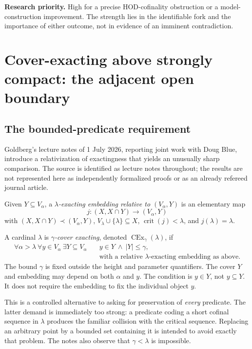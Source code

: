 \documentclass[11pt,letterpaper]{article}
\theoremstyle{definition}
\newcommand{\CEx}{\operatorname{CEx}}
\newcommand{\crit}{\operatorname{crit}}
\newcommand{\Priority}[1]{\textbf{Research priority.} #1}
\begin{document}
\Priority{High for a precise HOD-cofinality obstruction or a model-construction improvement. The strength lies in the identifiable fork and the importance of either outcome, not in evidence of an imminent contradiction.}

\section{Cover-exacting above strongly compact: the adjacent open boundary}\label{sec:cover}

\subsection{The bounded-predicate requirement}

Goldberg's lecture notes of 1 July 2026, reporting joint work with Doug Blue, introduce a relativization of exactingness that yields an unusually sharp comparison. The source is identified as lecture notes throughout; the results are not represented here as independently formalized proofs or as an already refereed journal article. \cite{cover}

Given $Y\subseteq V_\alpha$, a \emph{$\lambda$-exacting embedding relative to $(V_\alpha,Y)$} is an elementary map
\[
 j:(X,X\cap Y)\longrightarrow(V_\alpha,Y)
\]
with $(X,X\cap Y)\prec(V_\alpha,Y)$, $V_\lambda\cup\{\lambda\}\subseteq X$, $\crit(j)<\lambda$, and $j(\lambda)=\lambda$.

A cardinal $\lambda$ is \emph{$\gamma$-cover exacting}, denoted $\CEx_\gamma(\lambda)$, if
\begin{equation}
 \begin{split}
 \forall\alpha>\lambda\ \forall y\in V_\alpha\ \exists Y\subseteq V_\alpha\quad
 &y\in Y\ \wedge\ |Y|\leq\gamma,\\[-2pt]
 &\text{with a relative $\lambda$-exacting embedding as above.}
 \end{split}
 \label{eq:coverdef}
\end{equation}
The bound $\gamma$ is fixed outside the height and parameter quantifiers. The cover $Y$ and embedding may depend on both $\alpha$ and $y$. The condition is $y\in Y$, not $y\subseteq Y$. It does not require the embedding to fix the individual object $y$.

This is a controlled alternative to asking for preservation of \emph{every} predicate. The latter demand is immediately too strong: a predicate coding a short cofinal sequence in $\lambda$ produces the familiar collision with the critical sequence. Replacing an arbitrary point by a bounded set containing it is intended to avoid exactly that problem. The notes also observe that $\gamma<\lambda$ is impossible. \cite[Definitions~2.6 and~3.1]{cover}
\end{document}
